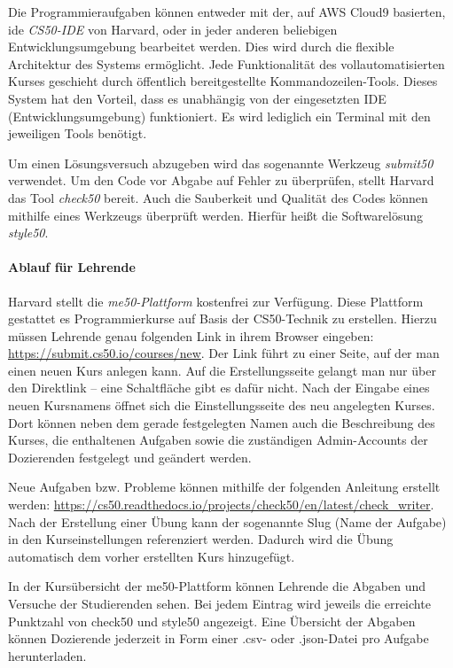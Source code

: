 Die Programmieraufgaben können entweder mit der, auf AWS Cloud9 basierten,
\ac{ide} \emph{CS50-IDE} von Harvard, oder in jeder anderen beliebigen
Entwicklungsumgebung bearbeitet werden. Dies wird durch die flexible Architektur
des Systems ermöglicht. Jede Funktionalität des vollautomatisierten Kurses
geschieht durch öffentlich bereitgestellte Kommandozeilen-Tools. Dieses System
hat den Vorteil, dass es unabhängig von der eingesetzten IDE
(Entwicklungsumgebung) funktioniert. Es wird lediglich ein Terminal mit den
jeweiligen Tools benötigt. \parencite{cs50-ide}

Um einen Lösungsversuch abzugeben wird das sogenannte Werkzeug \emph{submit50}
verwendet. Um den Code vor Abgabe auf Fehler zu überprüfen, stellt Harvard das
Tool \emph{check50} bereit. Auch die Sauberkeit und Qualität des Codes können
mithilfe eines Werkzeugs überprüft werden. Hierfür heißt die Softwarelösung
\emph{style50}. \parencite{submit50}

\paragraph{Ablauf für Lehrende}
Harvard stellt die \emph{me50-Plattform} kostenfrei zur Verfügung. Diese
Plattform gestattet es Programmierkurse auf Basis der CS50-Technik zu
erstellen. Hierzu müssen Lehrende genau folgenden Link in ihrem Browser
eingeben: \url{https://submit.cs50.io/courses/new}. Der Link führt zu einer
Seite, auf der man einen neuen Kurs anlegen kann. Auf die Erstellungsseite
gelangt man nur über den Direktlink -- eine Schaltfläche gibt es dafür nicht.
Nach der Eingabe eines neuen Kursnamens öffnet sich die Einstellungsseite des
neu angelegten Kurses. Dort können neben dem gerade festgelegten Namen auch die
Beschreibung des Kurses, die enthaltenen Aufgaben sowie die zuständigen
Admin-Accounts der Dozierenden festgelegt und geändert werden.

Neue Aufgaben bzw. Probleme können mithilfe der folgenden Anleitung erstellt
werden:
\url{https://cs50.readthedocs.io/projects/check50/en/latest/check_writer}. Nach
der Erstellung einer Übung kann der sogenannte Slug (Name der Aufgabe) in den 
Kurseinstellungen referenziert werden. Dadurch wird die Übung automatisch dem
vorher erstellten Kurs hinzugefügt.

In der Kursübersicht der me50-Plattform können Lehrende die Abgaben und Versuche
der Studierenden sehen. Bei jedem Eintrag wird jeweils die erreichte Punktzahl
von check50 und style50 angezeigt. Eine Übersicht der Abgaben können Dozierende
jederzeit in Form einer .csv- oder .json-Datei pro Aufgabe herunterladen.

